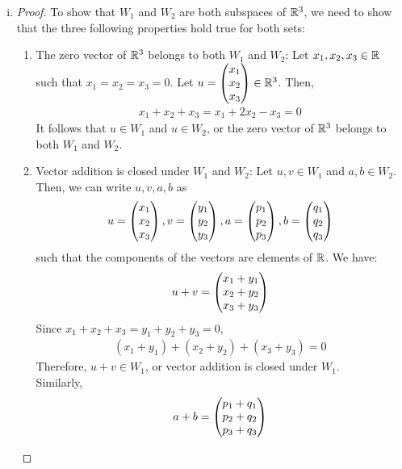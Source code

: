 \begin{sol}
    \begin{enumerate}[(i)]
        \item 
        \renewcommand\qedsymbol{$\blacksquare$}
        \begin{proof}
            To show that $W_1$ and $W_2$ are both subspaces of $\mathbb R^{3}$, we need to show that the three following properties hold true for both sets:
            \begin{enumerate}[(1)]
                \item The zero vector of $\mathbb R^{3}$ belongs to both $W_1$ and $W_2$: Let $x_1,x_2,x_3\in\mathbb R$ such that $x_1=x_2=x_3=0$. Let $u=\begin{pmatrix} x_1\\ x_2\\ x_3\end{pmatrix}\in\mathbb R^{3}$. Then,
                \[
                    \begin{aligned}
                        x_1+x_2+x_3=x_1+2x_2-x_3=0
                    \end{aligned}
                \]
                It follows that $u\in W_1$ and $u\in W_2$, or the zero vector of $\mathbb R^{3}$ belongs to both $W_1$ and $W_2$.
                \item Vector addition is closed under $W_1$ and $W_2$: Let $u,v\in W_1$ and $a,b\in W_2$. Then, we can write $u,v,a,b$ as
                \[
                    \begin{aligned}
                        u = \begin{pmatrix} x_1\\ x_2\\ x_3\end{pmatrix},
                        v = \begin{pmatrix} y_1\\ y_2\\ y_3\end{pmatrix},
                        a = \begin{pmatrix} p_1\\ p_2\\ p_3\end{pmatrix},
                        b = \begin{pmatrix} q_1\\ q_2\\ q_3\end{pmatrix}
                    \end{aligned}  
                \]
                such that the components of the vectors are elements of $\mathbb R$. We have:
                \[
                    \begin{aligned}
                        u+v = \begin{pmatrix} x_1+y_1\\ x_2+y_2\\ x_3+y_3\end{pmatrix}
                    \end{aligned}    
                \]
                Since $x_1+x_2+x_3=y_1+y_2+y_3=0$,
                \[
                    \begin{aligned}
                        (x_1+y_1)+(x_2+y_2)+(x_3+y_3)=0
                    \end{aligned}  
                \]
                Therefore, $u+v\in W_1$, or vector addition is closed under $W_1$.\\
                Similarly,
                \[
                    \begin{aligned}
                        a+b = \colvecthree{p_1+q_1}{p_2+q_2}{p_3+q_3}

\end{aligned}\]
\end{enumerate}
\end{proof}
\end{enumerate}
\end{sol}
